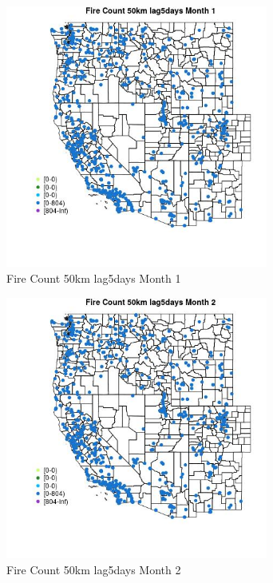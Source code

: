 \begin{figure} 
\centering  
\includegraphics[width=0.77\textwidth]{Code_Outputs/Report_ML_input_PM25_Step4_part_f_de_duplicated_aveswNAs_MapObsMo1Fire_Count_50km_lag5days.jpg} 
\caption{\label{fig:Report_ML_input_PM25_Step4_part_f_de_duplicated_aveswNAsMapObsMo1Fire_Count_50km_lag5days}Fire Count 50km lag5days Month 1} 
\end{figure} 
 

\begin{figure} 
\centering  
\includegraphics[width=0.77\textwidth]{Code_Outputs/Report_ML_input_PM25_Step4_part_f_de_duplicated_aveswNAs_MapObsMo2Fire_Count_50km_lag5days.jpg} 
\caption{\label{fig:Report_ML_input_PM25_Step4_part_f_de_duplicated_aveswNAsMapObsMo2Fire_Count_50km_lag5days}Fire Count 50km lag5days Month 2} 
\end{figure} 
 

